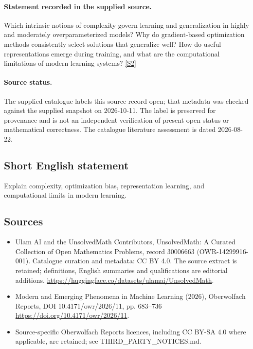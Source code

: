 \documentclass[11pt]{article}
\begin{document}
\paragraph{Statement recorded in the supplied source.}
Which intrinsic notions of complexity govern learning and generalization in highly and moderately overparameterized models? Why do gradient-based optimization methods consistently select solutions that generalize well? How do useful representations emerge during training, and what are the computational limitations of modern learning systems? \href{https://doi.org/10.4171/owr/2026/11}{[S2]}
\paragraph{Source status.}
The supplied catalogue labels this source record open; that metadata was checked against the supplied snapshot on 2026-10-11. The label is preserved for provenance and is not an independent verification of present open status or mathematical correctness. The catalogue literature assessment is dated 2026-08-22.
\subsection{Short English statement}
Explain complexity, optimization bias, representation learning, and computational limits in modern learning.
\subsection{Sources}
\begin{itemize}
\item[S1] Ulam AI and the UnsolvedMath Contributors, UnsolvedMath: A Curated Collection of Open Mathematics Problems, record 30006663 (OWR-14299916-001). Catalogue curation and metadata: CC BY 4.0. The source extract is retained; definitions, English summaries and qualifications are editorial additions.
\url{https://huggingface.co/datasets/ulamai/UnsolvedMath}.
\item[S2] Modern and Emerging Phenomena in Machine Learning (2026), Oberwolfach Reports, DOI 10.4171/owr/2026/11, pp. 683--736
\url{https://doi.org/10.4171/owr/2026/11}.
\item Source-specific Oberwolfach Reports licences, including CC BY-SA 4.0 where applicable, are retained; see THIRD\_PARTY\_NOTICES.md.
\end{itemize}
\end{document}
